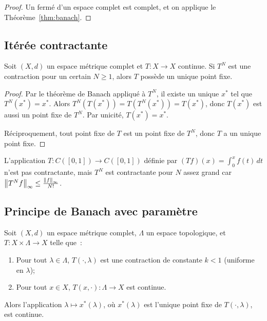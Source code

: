 \begin{proof}
Un ferm\'e d'un espace complet est complet, et on applique le
Th\'eor\`eme~\ref{thm:banach}.
\end{proof}

\subsection{It\'er\'ee contractante}

\begin{theoreme}[It\'er\'ee contractante]
Soit $(X, d)$ un espace m\'etrique complet et $T : X \to X$ continue.
Si $T^N$ est une contraction pour un certain $N \geq 1$, alors $T$ poss\`ede
un unique point fixe.
\end{theoreme}

\begin{proof}
Par le th\'eor\`eme de Banach appliqu\'e \`a $T^N$, il existe un unique $x^*$ tel
que $T^N(x^*) = x^*$. Alors $T^N(T(x^*)) = T(T^N(x^*)) = T(x^*)$, donc
$T(x^*)$ est aussi un point fixe de $T^N$. Par unicit\'e, $T(x^*) = x^*$.

R\'eciproquement, tout point fixe de $T$ est un point fixe de $T^N$, donc $T$
a un unique point fixe.
\end{proof}

\begin{exemple}
L'application $T : C([0,1]) \to C([0,1])$ d\'efinie par
$(Tf)(x) = \int_0^x f(t) \, dt$ n'est pas contractante, mais $T^N$ est
contractante pour $N$ assez grand car $\left\| T^N f \right\|_\infty \leq
\frac{\left\| f \right\|_\infty}{N!}$.
\end{exemple}

\subsection{Principe de Banach avec param\`etre}

\begin{theoreme}
Soit $(X, d)$ un espace m\'etrique complet, $\Lambda$ un espace topologique, et
$T : X \times \Lambda \to X$ telle que~:
\begin{enumerate}
    \item Pour tout $\lambda \in \Lambda$, $T(\cdot, \lambda)$ est une contraction
          de constante $k < 1$ (uniforme en $\lambda$);
    \item Pour tout $x \in X$, $T(x, \cdot) : \Lambda \to X$ est continue.
\end{enumerate}
Alors l'application $\lambda \mapsto x^*(\lambda)$, o\`u $x^*(\lambda)$ est
l'unique point fixe de $T(\cdot, \lambda)$, est continue.
\end{theoreme}


